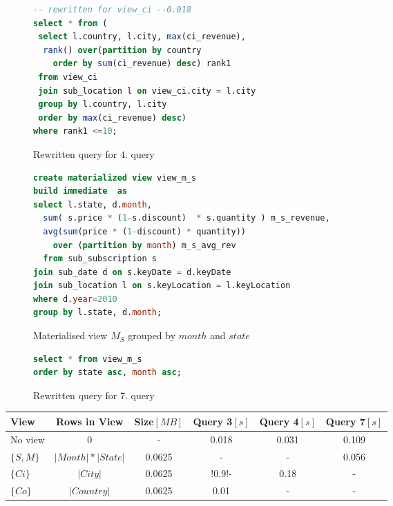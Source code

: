 \begin{figure}[!hbp]
\begin{lstlisting}[language=sql] 
-- rewritten for view_ci --0.018
select * from (
 select l.country, l.city, max(ci_revenue),  
  rank() over(partition by country 
    order by sum(ci_revenue) desc) rank1 
 from view_ci 
 join sub_location l on view_ci.city = l.city
 group by l.country, l.city
 order by max(ci_revenue) desc)
where rank1 <=10;
\end{lstlisting}
\caption{\label{s:requery_4} Rewritten query for $4$. query}
\end{figure}

\begin{figure}[!hbp]
\begin{lstlisting}[language=sql] 
create materialized view view_m_s 
build immediate  as
select l.state, d.month, 
  sum( s.price * (1-s.discount)  * s.quantity ) m_s_revenue,
  avg(sum(price * (1-discount) * quantity)) 
    over (partition by month) m_s_avg_rev
  from sub_subscription s
join sub_date d on s.keyDate = d.keyDate
join sub_location l on s.keyLocation = l.keyLocation
where d.year=2010
group by l.state, d.month; 
\end{lstlisting}
\caption{\label{s:view_m_s} Materialised view ${M_S}$ grouped by $month$ and $state$}
\end{figure}

\begin{figure}[!hbp]
\begin{lstlisting}[language=sql] 
select * from view_m_s
order by state asc, month asc;
\end{lstlisting}
\caption{\label{s:requery_7} Rewritten query for $7$. query}
\end{figure}


\begin{tabular}{|l|c|c|c|c|c|}
\hline
View & Rows in View & Size$[MB]$ & Query 3$[s]$ & Query 4$[s]$ & Query 7$[s]$\\
\hline
\hline
No view & 0 & - & 0.018 & 0.031 & 0.109 \\
$\{S,M\}$ & $|Month|*|State|$ & 0.0625 & - & - & 0.056\\
$\{Ci\}$ & $|City|$ & 0.0625 & !0.9!- & 0.18 & -\\
$\{Co\}$ & $|Country|$ &0.0625 & 0.01 & - & -\\
\hline
\end{tabular}


